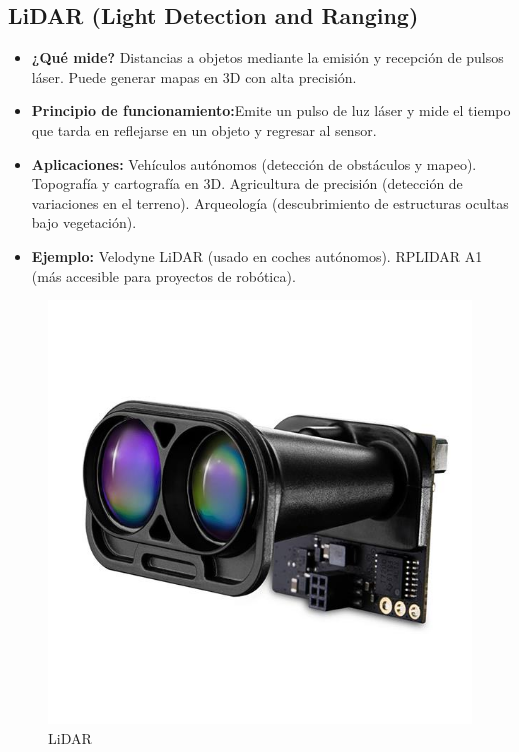 \subsection*{LiDAR (Light Detection and Ranging)}
\begin{itemize}
	\item \textbf{¿Qué mide?} Distancias a objetos mediante la emisión y recepción de pulsos láser.
	Puede generar mapas en 3D con alta precisión.
	\item \textbf{Principio de funcionamiento:}Emite un pulso de luz láser y mide el tiempo que tarda en reflejarse en un objeto y regresar al sensor.
	\item \textbf{Aplicaciones:} Vehículos autónomos (detección de obstáculos y mapeo).
	Topografía y cartografía en 3D.
	Agricultura de precisión (detección de variaciones en el terreno).
	Arqueología (descubrimiento de estructuras ocultas bajo vegetación).
	\item \textbf{Ejemplo:} Velodyne LiDAR (usado en coches autónomos).
	RPLIDAR A1 (más accesible para proyectos de robótica).
	\cite{yellowscan_lidar_2025}
\end{itemize}
\begin{figure}[h]
	\centering
	\includegraphics[width=0.3\linewidth]{img/LiDAR}
	\caption{LiDAR}
	\label{fig:LiDAR}
\end{figure}